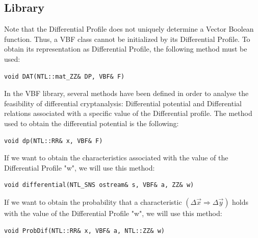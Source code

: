 \subsection{Library}

Note that the Differential Profile does not uniquely determine a Vector Boolean function. Thus, a VBF class cannot be initialized by its Differential Profile. To obtain its representation as Differential Profile, the following method must be used:

\begin{verbatim}
void DAT(NTL::mat_ZZ& DP, VBF& F)
\end{verbatim}

In the VBF library, several methods have been defined in order to analyse the feasibility of differential cryptanalysis: Differential potential and Differential relations associated with a specific value of the Differential profile. The method used to obtain the differential potential is the following:

\begin{verbatim}
void dp(NTL::RR& x, VBF& F)
\end{verbatim}

If we want to obtain the characteristics associated with the value of the Differential Profile "w", we will use this method:

\begin{verbatim}
void differential(NTL_SNS ostream& s, VBF& a, ZZ& w)
\end{verbatim}

If we want to obtain the probability that a characteristic $(\Delta \vec{x} \Rightarrow \Delta \vec{y})$ holds with the value of the Differential Profile "w", we will use this method:

\begin{verbatim}
void ProbDif(NTL::RR& x, VBF& a, NTL::ZZ& w)
\end{verbatim}

